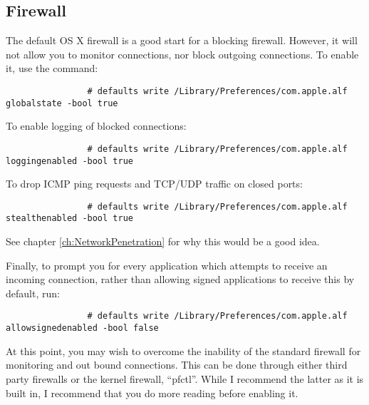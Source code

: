 		\subsection{Firewall}
			The default OS X firewall is a good start for a blocking firewall.
			However, it will not allow you to monitor connections, nor block outgoing connections.
			To enable it, use the command:
			\begin{verbatim}
				# defaults write /Library/Preferences/com.apple.alf globalstate -bool true
			\end{verbatim}
			To enable logging of blocked connections:
			\begin{verbatim}
				# defaults write /Library/Preferences/com.apple.alf loggingenabled -bool true
			\end{verbatim}
			To drop ICMP ping requests and TCP/UDP traffic on closed ports:
			\begin{verbatim}
				# defaults write /Library/Preferences/com.apple.alf stealthenabled -bool true
			\end{verbatim}
			See chapter \ref{ch:NetworkPenetration} for why this would be a good idea.

			Finally, to prompt you for every application which attempts to receive an incoming connection, rather than allowing signed applications to receive this by default, run:
			\begin{verbatim}
				# defaults write /Library/Preferences/com.apple.alf allowsignedenabled -bool false
			\end{verbatim}

			At this point, you may wish to overcome the inability of the standard firewall for monitoring and out bound connections.
			This can be done through either third party firewalls or the kernel firewall, ``pfctl''.
			While I recommend the latter as it is built in, I recommend that you do more reading before enabling it.

